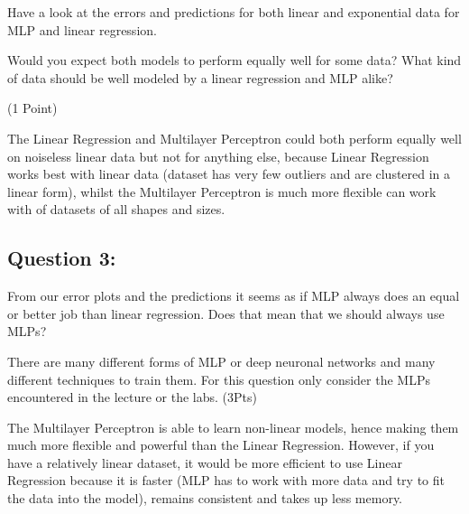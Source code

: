 \documentclass[11pt]{article}
\begin{document}
Have a look at the errors and predictions for both linear and
exponential data for MLP and linear regression.

Would you expect both models to perform equally well for some data? What
kind of data should be well modeled by a linear regression and MLP
alike?

(1 Point)

    The Linear Regression and Multilayer Perceptron could both perform
equally well on noiseless linear data but not for anything else, because
Linear Regression works best with linear data (dataset has very few
outliers and are clustered in a linear form), whilst the Multilayer
Perceptron is much more flexible can work with of datasets of all shapes
and sizes.

    \subsection{Question 3:}\label{question-3}

From our error plots and the predictions it seems as if MLP always does
an equal or better job than linear regression. Does that mean that we
should always use MLPs?

There are many different forms of MLP or deep neuronal networks and many
different techniques to train them. For this question only consider the
MLPs encountered in the lecture or the labs. (3Pts)

    The Multilayer Perceptron is able to learn non-linear models, hence
making them much more flexible and powerful than the Linear Regression.
However, if you have a relatively linear dataset, it would be more
efficient to use Linear Regression because it is faster (MLP has to work
with more data and try to fit the data into the model), remains
consistent and takes up less memory.


    
    
    
    
\end{document}
